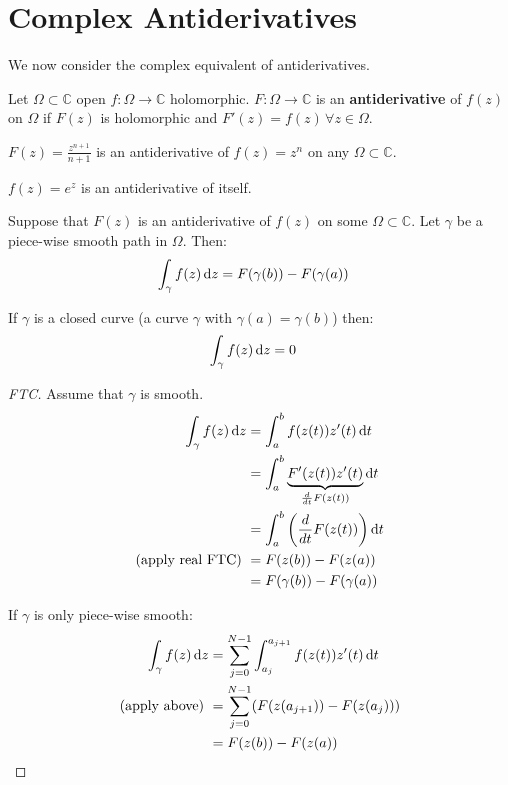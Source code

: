 \section{Complex Antiderivatives}

We now consider the complex equivalent of antiderivatives.

\begin{definition}[Antiderivatives]
Let $\Omega \subset \mathbb{C}$ open $f:\Omega \rightarrow \mathbb{C}$ holomorphic. $F:\Omega \rightarrow \mathbb{C}$ is an \textbf{antiderivative} of $f(z)$ on $\Omega$ if $F(z)$ is holomorphic and $F'(z) = f(z) \, \forall z\in\Omega $.
\end{definition}

\begin{example}
$F(z) = \frac{z^{n+1}}{n+1}$ is an antiderivative of $f(z) = z^n$ on any $\Omega \subset \mathbb{C}$.
\end{example}
\begin{example}
$f(z) = e^z$ is an antiderivative of itself.
\end{example}

\begin{theorem}
Suppose that $F(z)$ is an antiderivative of $f(z)$ on some $\Omega \subset \mathbb{C}$. Let $\gamma$ be a piece-wise smooth path in $\Omega$. Then:
\begin{align*}
    \int_\gamma f(z)  \dif z &= F(\gamma(b)) - F(\gamma(a))
\end{align*}
\end{theorem}


\begin{corollary}
If $\gamma$ is a closed curve (a curve $\gamma$ with $\gamma(a)=\gamma(b)$) then:
\begin{align*}
    \int_\gamma f(z)  \dif z &= 0
\end{align*}

\end{corollary}

\begin{proof}[FTC]
Assume that $\gamma$ is smooth.
\begin{align*}
    \int_\gamma f(z)  \dif z &= \int_a^b f(z(t)) z'(t)  \dif t\\
    &= \int_a^b \underbrace{F'(z(t)) z'(t)}_{\frac{d}{  dt} F(z(t))}  \dif t\\
    &= \int_a^b \left( \frac{d}{ dt} F(z(t)) \right)  \dif t\\
    \text{(apply real FTC) }&= F(z(b))-F(z(a))\\
    &= F(\gamma(b)) - F(\gamma(a))
\end{align*}

If $\gamma$ is only piece-wise smooth:
\begin{align*}
    \int_\gamma f(z) \dif z &= \sum_{j=0}^{N-1} \int_ {a_j}^{a_{j+1}} f(z(t))z'(t) \dif t\\
   \text{(apply above) } &= \sum_{j=0}^{N-1} (F(z(a_{j+1}))-F(z(a_j)))\\
   &= F(z(b)) - F(z(a))
\end{align*}
\end{proof}

